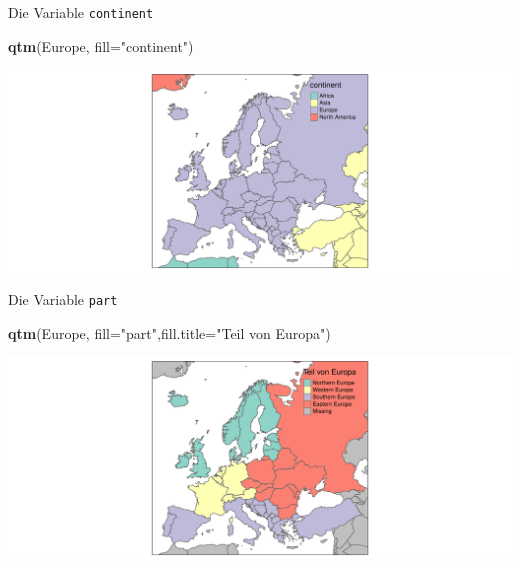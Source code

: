\documentclass[ignorenonframetext,]{beamer}
\newenvironment{Shaded}{\begin{snugshade}}{\end{snugshade}}
\newcommand{\KeywordTok}[1]{\textcolor[rgb]{0.13,0.29,0.53}{\textbf{#1}}}
\newcommand{\DataTypeTok}[1]{\textcolor[rgb]{0.13,0.29,0.53}{#1}}
\newcommand{\StringTok}[1]{\textcolor[rgb]{0.31,0.60,0.02}{#1}}
\newcommand{\NormalTok}[1]{#1}
\begin{document}
\begin{frame}[fragile]{Die Variable \texttt{continent}}

\begin{Shaded}
\begin{Highlighting}[]
\KeywordTok{qtm}\NormalTok{(Europe, }\DataTypeTok{fill=}\StringTok{"continent"}\NormalTok{)}
\end{Highlighting}
\end{Shaded}

\includegraphics{slides_all2gether_part1_files/figure-beamer/unnamed-chunk-56-1.pdf}

\end{frame}

\begin{frame}[fragile]{Die Variable \texttt{part}}

\begin{Shaded}
\begin{Highlighting}[]
\KeywordTok{qtm}\NormalTok{(Europe, }\DataTypeTok{fill=}\StringTok{"part"}\NormalTok{,}\DataTypeTok{fill.title=}\StringTok{"Teil von Europa"}\NormalTok{)}
\end{Highlighting}
\end{Shaded}

\includegraphics{slides_all2gether_part1_files/figure-beamer/unnamed-chunk-57-1.pdf}

\end{frame}
\end{document}
